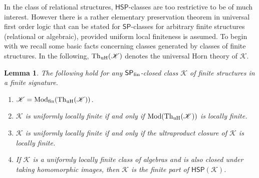 \documentclass[10pt,a4paper]{amsart}
\theoremstyle{plain}
\newtheorem{lem}[thm]{Lemma}
\theoremstyle{definition}
\newcommand{\Mod}{\operatorname{Mod}}
\newcommand{\Th}{\operatorname{Th}}
\begin{document}
 In the class of relational structures, $\mathsf{HSP}$-classes are too restrictive to be of much interest.  However there is a rather elementary preservation theorem in universal first order logic that can be stated for $\mathsf{SP}$-classes for arbitrary finite structures (relational or algebraic), provided uniform local finiteness is assumed.  To begin with we recall some basic facts concerning classes generated by classes of finite structures.  
 In the following, $\Th_{\rm uH}(\mathscr{K})$ denotes the universal Horn theory of $\mathscr{K}$.
\begin{lem}\label{lem:ulf}
The following hold for any $\mathsf{SP}_{\rm fin}$-closed class $\mathscr{K}$ of finite structures in a finite signature.
\begin{enumerate}
\item $\mathscr{K}=\Mod_{\rm fin}(\Th_{\rm uH}(\mathscr{K}))$.
\item $\mathscr{K}$ is uniformly locally finite if and only if  $\Mod(\Th_{\rm uH}(\mathscr{K}))$ is locally finite.
\item $\mathscr{K}$ is uniformly locally finite if and only if the ultraproduct closure of $\mathscr{K}$ is locally finite.
\item If $\mathscr{K}$ is a uniformly locally finite class of algebras and is also closed under taking homomorphic images, then $\mathscr{K}$ is the finite part of $\mathsf{HSP}(\mathscr{K})$.
\end{enumerate}
\end{lem}
\end{document}
